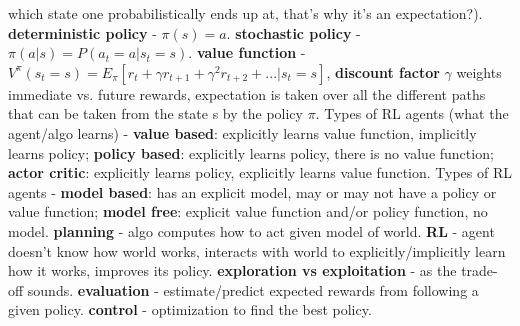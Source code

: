 \documentclass{article}
\begin{document}
\begin{itemize}
which state one probabilistically ends up at, that's why it's an expectation?). \textbf{deterministic policy} - $\pi(s)=a$. \textbf{stochastic policy} - $\pi(a|s) = P(a_t=a | s_t=s)$. \textbf{value function} - $V^\pi(s_t=s) = E_\pi[r_t + \gamma r_{t+1} + \gamma^2 r_{t+2} + ... | s_t=s]$, \textbf{discount factor} $\gamma$ weights immediate vs. future rewards, expectation is taken over all the different paths that can be taken from the state s by the policy $\pi$. Types of RL agents (what the agent/algo learns) - \textbf{value based}: explicitly learns value function, implicitly learns policy; \textbf{policy based}: explicitly learns policy, there is no value function; \textbf{actor critic}: explicitly learns policy, explicitly learns value function. Types of RL agents - \textbf{model based}: has an explicit model, may or may not have a policy or value function; \textbf{model free}: explicit value function and/or policy function, no model. \textbf{planning} - algo computes how to act given model of world. \textbf{RL} - agent doesn't know how world works, interacts with world to explicitly/implicitly learn how it works, improves its policy. \textbf{exploration vs exploitation} - as the trade-off sounds. \textbf{evaluation} - estimate/predict expected rewards from following a given policy. \textbf{control} - optimization to find the best policy. 

\end{itemize}
\end{document}
